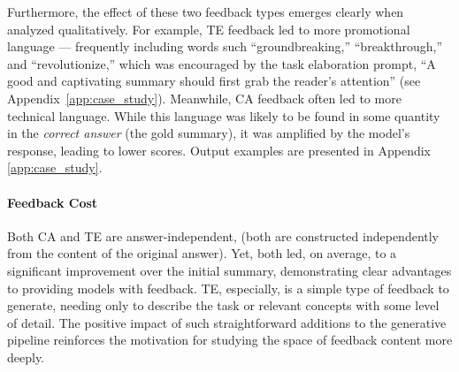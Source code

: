 Furthermore, the effect of these two feedback types emerges clearly when analyzed qualitatively. For example, TE feedback led to more promotional language --- frequently including words such ``groundbreaking,'' ``breakthrough,'' and ``revolutionize,'' which was encouraged by the task elaboration prompt, ``A good and captivating summary should
first grab the reader’s attention'' (see Appendix~\ref{app:case_study}). Meanwhile, CA feedback often led to more technical language. While this language was likely to be found in some quantity in the \textit{correct answer} (\ie the gold summary), it was amplified by the model's response, leading to lower scores. Output examples are presented in Appendix \ref{app:case_study}.

\paragraph{Feedback Cost} Both CA and TE are answer-independent, (\ie both are constructed independently from the content of the original answer). Yet, both led, on average, to a significant improvement over the initial summary, demonstrating clear advantages to providing models with feedback. 
TE, especially, is a simple type of feedback to generate, needing only to describe the task or relevant concepts with some level of detail. The positive impact of such straightforward additions to the generative pipeline reinforces the motivation for studying the space of feedback content more deeply. 
